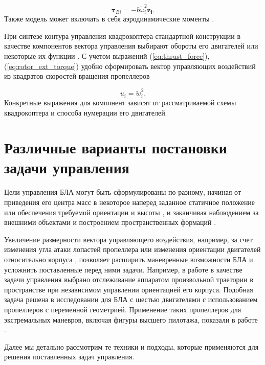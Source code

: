 \begin{equation} \label{eq:rotor_ext_torque}
\bm{\tau}_{Bi} = -b \tilde{\omega}^2_i \bm{z_i}.
\end{equation}
Также модель может включать в себя аэродинамические моменты \cite{Solovev01}.

При синтезе контура управления квадрокоптера стандартной конструкции в качестве компонентов вектора управления выбирают обороты его двигателей или некоторые их функции \cite{Sharifi01, Luukkonen01, Bemporad01}.  С учетом выражений (\ref{eq:thrust_force}), (\ref{eq:rotor_ext_torque}) удобно сформировать вектор управляющих воздействий из квадратов скоростей вращения пропеллеров

\begin{equation} \label{eq:common_control_vector}
u_i = \tilde{w}_i^2.
\end{equation}
Конкретные выражения для компонент зависят от рассматриваемой схемы квадрокоптера и способа нумерации его двигателей.
 
\section{Различные варианты постановки задачи управления}
Цели управления БЛА могут быть сформулированы по-разному,
начиная от приведения его центра масс в некоторое наперед заданное статичное положение
\cite{Huynh01, Yuskin01}
или обеспечения требуемой ориентации и высоты
\cite{Domingos01, Wang01, Gheorghita01, Lukmana01, Zabko01},
и заканчивая наблюдением за внешними объектами
\cite{Rodriguez01, Kendall01, Razinkova01}
и построением пространственных формаций
\cite{Ali01, Zhao01, Preiss01}.
 
Увеличение размерности вектора управляющего воздействия, например, за счет изменения угла атаки лопастей пропеллера \cite{Cutler01, Cutler02}  или изменения ориентации двигателей относительно корпуса \cite{Sridhar02, Kumar02}, позволяет расширить маневренные возможности БЛА и усложнить поставленные перед ними задачи. Например, в работе \cite{Ryll02} в качестве задачи управления выбрано отслеживание аппаратом произвольной траетории в пространстве при независимом управлении ориентацией его корпуса. Подобная задача решена в исследовании \cite{Kaufman01} для БЛА с шестью двигателями с использованием пропеллеров с переменной геометрией. Применение таких пропеллеров для экстремальных маневров, включая фигуры высшего пилотажа, показали в работе \cite{Cutler02}.
 
Далее мы детально рассмотрим те техники и подходы, которые применяются для решения поставленных задач управления. 

